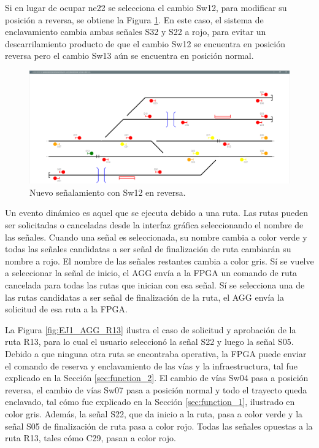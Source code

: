 	Si en lugar de ocupar ne22 se selecciona el cambio Sw12, para modificar su posición a reversa, se obtiene la Figura \ref{fig:EJ1_AGG_SW12_REVERSE}. En este caso, el sistema de enclavamiento cambia ambas señales S32 y S22 a rojo, para evitar un descarrilamiento producto de que el cambio Sw12 se encuentra en posición reversa pero el cambio Sw13 aún se encuentra en posición normal.		
	
	\begin{figure}[H]
		\centering
		\includegraphics[origin = c, width=1\textwidth]{resultados-obtenidos/ejemplo1/images/AGG_S32_NO}
		\centering\caption{Nuevo señalamiento con Sw12 en reversa.}
		\label{fig:EJ1_AGG_SW12_REVERSE}
	\end{figure}
	
	Un evento dinámico es aquel que se ejecuta debido a una ruta. Las rutas pueden ser solicitadas o canceladas desde la interfaz gráfica seleccionando el nombre de las señales. Cuando una señal es seleccionada, su nombre cambia a color verde y todas las señales candidatas a ser señal de finalización de ruta cambiarán su nombre a rojo. El nombre de las señales restantes cambia a color gris. Sí se vuelve a seleccionar la señal de inicio, el AGG envía a la FPGA un comando de ruta cancelada para todas las rutas que inician con esa señal. Sí se selecciona una de las rutas candidatas a ser señal de finalización de la ruta, el AGG envía la solicitud de esa ruta a la FPGA.
	
	La Figura \ref{fig:EJ1_AGG_R13}	ilustra el caso de solicitud y aprobación de la ruta R13, para lo cual el usuario seleccionó la señal S22 y luego la señal S05. Debido a que ninguna otra ruta se encontraba operativa, la FPGA puede enviar el comando de reserva y enclavamiento de las vías y la infraestructura, tal fue explicado en la Sección \ref{sec:function_2}. El cambio de vías Sw04 pasa a posición reversa, el cambio de vías Sw07 pasa a posición normal y todo el trayecto queda enclavado, tal cómo fue explicado en la Sección \ref{sec:function_1}, ilustrado en color gris. Además, la señal S22, que da inicio a la ruta, pasa a color verde y la señal S05 de finalización de ruta pasa a color rojo. Todas las señales opuestas a la ruta R13, tales cómo C29, pasan a color rojo. 
	
